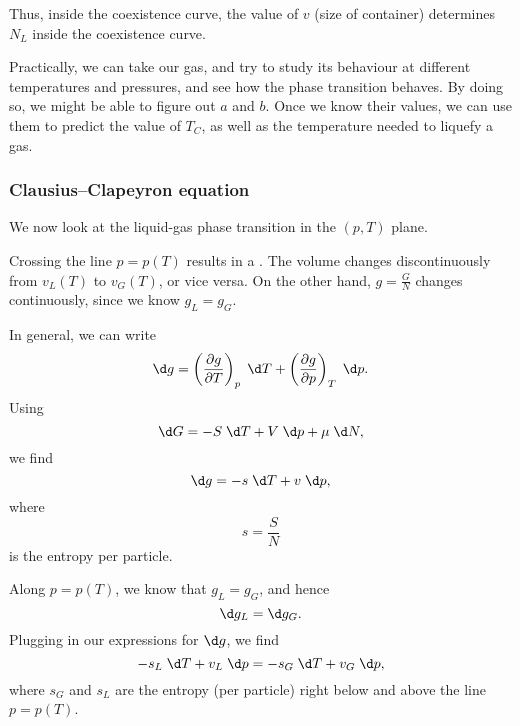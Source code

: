 \documentclass[a4paper]{article}
\begin{document}
\begin{center}
\end{center}
Thus, inside the coexistence curve, the value of $v$ (size of container) determines $N_L$ inside the coexistence curve.

Practically, we can take our gas, and try to study its behaviour at different temperatures and pressures, and see how the phase transition behaves. By doing so, we might be able to figure out $a$ and $b$. Once we know their values, we can use them to predict the value of $T_C$, as well as the temperature needed to liquefy a gas.

\subsubsection*{Clausius--Clapeyron equation}
We now look at the liquid-gas phase transition in the $(p, T)$ plane.
\begin{center}
\end{center}
Crossing the line $p = p(T)$ results in a . The volume changes discontinuously from $v_L(T)$ to $v_G(T)$, or vice versa. On the other hand, $g = \frac{G}{N}$ changes continuously, since we know $g_L = g_G$.

In general, we can write
\[
  \d g = \left(\frac{\partial g}{\partial T}\right)_p \;\d T + \left(\frac{\partial g}{\partial p}\right)_T \;\d p.
\]
Using
\[
  \d G = -S\;\d T + V \;\d p + \mu \;\d N,
\]
we find
\[
  \d g = - s\;\d T + v\;\d p,
\]
where
\[
  s = \frac{S}{N}
\]
is the entropy per particle.

Along $p = p(T)$, we know that $g_L = g_G$, and hence
\[
  \d g_L = \d g_G.
\]
Plugging in our expressions for $\d g$, we find
\[
  - s_L \;\d T + v_L \;\d p = - s_G \;\d T + v_G \;\d p,
\]
where $s_G$ and $s_L$ are the entropy (per particle) right below and above the line $p = p(T)$.
\end{document}
